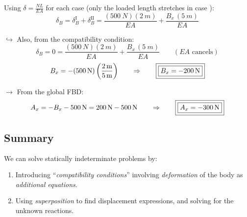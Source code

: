 \documentclass[11pt]{article}
\begin{document}
\noindent
Using $\delta = \frac{NL}{EA}$ for each case (only the loaded length stretches in case
):
\[
  \delta_B = \delta_B^{\text{I}} + \delta_B^{\text{II}}
  = \frac{(\SI{500}{N})(\SI{2}{m})}{EA} + \frac{B_x\,(\SI{5}{m})}{EA}
\]

\noindent
$\hookrightarrow$ Also, from the compatibility condition:
\[
  \delta_B = 0 = \frac{(\SI{500}{N})(\SI{2}{m})}{EA} + \frac{B_x\,(\SI{5}{m})}{EA}
  \qquad (EA \text{ cancels})
\]
\[
  B_x = -(\SI{500}{N})\left(\frac{\SI{2}{m}}{\SI{5}{m}}\right)
  \qquad\Rightarrow\qquad
  \fbox{\fbox{$B_x = -\SI{200}{N}$}}
\]

\noindent
$\rightarrow$ From the global FBD:
\[
  A_x = -B_x - \SI{500}{N} = \SI{200}{N} - \SI{500}{N}
  \qquad\Rightarrow\qquad
  \fbox{\fbox{$A_x = -\SI{300}{N}$}}
\]

\subsection*{Summary}

\noindent
We can solve statically indeterminate problems by:
\begin{enumerate}
  \item Introducing ``\emph{compatibility conditions}'' involving \emph{deformation} of the
        body as \emph{additional equations}.
  \item Using \emph{superposition} to find displacement expressions, and solving for the
        unknown reactions.
\end{enumerate}
\end{document}
